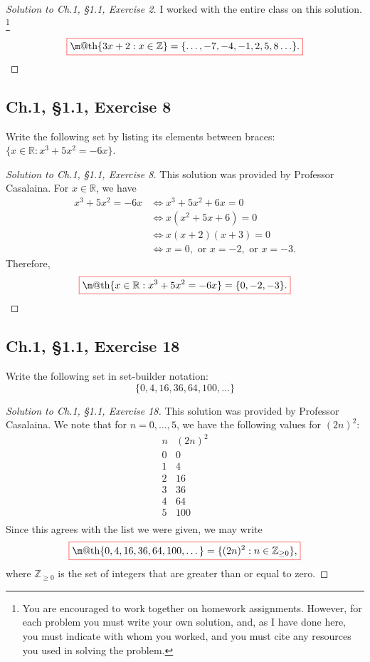 \documentclass[12pt]{amsart}
\makeatletter
\newcommand*{\boxedcolor}{red}
\renewcommand{\boxed}[1]{\textcolor{\boxedcolor}{%
  \fbox{\normalcolor\m@th$\displaystyle#1$}}}
\numberwithin{equation}{section}
\theoremstyle{definition}
\theoremstyle{remark}
\newcommand{\marg}[1]{\normalsize{{\color{red}\footnote{{\color{blue}#1}}}{\marginpar[\vskip -.3cm {\color{BrickRed}\hfill\thefootnote$\implies$}]{\vskip -.3cm{ \color{BrickRed}$\impliedby$\thefootnote}}}}}
\newcommand{\qc}[1]{\marg{#1}}
\makeatother
\begin{document}
\begin{proof}[Solution to Ch.1, \S 1.1,  Exercise 2] I worked with the entire class on this solution.
\qc{You are encouraged to work together on homework assignments.  However, for each problem you must write your own solution, and, as I have done here,  you must indicate with whom you worked, and you must cite any resources you used in solving  the  problem.}

$$
\boxed{
\{3x+2:x\in \mathbb Z\}=\{\ldots, -7, -4, -1, 2, 5, 8  \ldots \}.
}
$$

\end{proof}




\subsection*{Ch.1, \S 1.1,  Exercise 8}  Write the following set by listing its elements between braces: 
$\{x \in \mathbb R : x^3+5x^2=-6x\}$.   


\begin{proof}[Solution to Ch.1, \S 1.1,  Exercise 8]
This solution was provided by Professor Casalaina.  
For $x\in \mathbb R$, we have
\begin{align*}
x^3+5x^2=-6x &\iff x^3+5x^2+6x=0\\
& \iff x(x^2+5x+6)=0\\
& \iff x(x+2)(x+3)=0\\
& \iff x=0, \text{ or } x=-2, \text{ or } x=-3.
\end{align*}
Therefore, 
$$
\boxed{
\{x \in \mathbb R : x^3+5x^2=-6x\}= \{ 0, -2, -3\}.
}
$$
\end{proof}




\subsection*{Ch.1, \S 1.1,  Exercise 18}  Write the following set in set-builder notation:
$$
\{0,4,16,36,64,100,\dots \}
$$



\begin{proof}[Solution to Ch.1, \S 1.1,  Exercise 18] This solution was provided by Professor Casalaina.  
We note that for $n=0,\dots,5$, we have the following values for 
$(2n)^2$:
$$
\begin{array}{c|c}
n& (2n)^2\\ \hline
0& 0 \\
1& 4\\
2& 16\\
3& 36\\
4& 64\\
5& 100\\
\end{array}
$$
Since this agrees with the list we were given, we may write
$$
\boxed{
\{0,4,16,36,64,100,\dots \}=\{(2n)^2: n\in \mathbb Z_{\ge 0}\},
}
$$
where $\mathbb Z_{\ge 0}$ is the set of integers that are greater than or equal to zero.
\end{proof}
\end{document}
